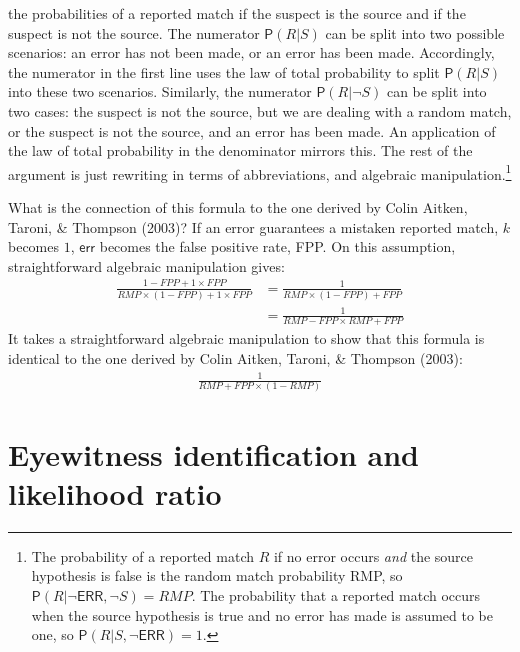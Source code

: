 \documentclass[
  10pt,
  dvipsnames,enabledeprecatedfontcommands]{scrartcl}
\newcommand{\n}{\neg}
\newcommand{\pr}[1]{\mathsf{P}(#1)}
\begin{document}
the probabilities of a reported match if the suspect is the source and
if the suspect is not the source. The numerator \(\pr{R\vert S}\) can be
split into two possible scenarios: an error has not been made, or an
error has been made. Accordingly, the numerator in the first line uses
the law of total probability to split \(\pr{R\vert S}\) into these two
scenarios. Similarly, the numerator \(\pr{R\vert \n S}\) can be split
into two cases: the suspect is not the source, but we are dealing with a
random match, or the suspect is not the source, and an error has been
made. An application of the law of total probability in the denominator
mirrors this. The rest of the argument is just rewriting in terms of
abbreviations, and algebraic manipulation.\footnote{The probability of a
  reported match \(R\) if no error occurs \textit{and} the source
  hypothesis is false is the random match probability RMP, so
  \(\pr{R \vert \n \mathsf{ERR}, \n S}=RMP\). The probability that a
  reported match occurs when the source hypothesis is true and no error
  has made is assumed to be one, so
  \(\pr{R \vert S, \n \mathsf{ERR}} =1\).}

What is the connection of this formula to the one derived by Colin
Aitken, Taroni, \& Thompson (2003)? If an error guarantees a mistaken
reported match, \(k\) becomes \(1\), \(\mathsf{err}\) becomes the false
positive rate, FPP. On this assumption, straightforward algebraic
manipulation gives: \begin{align*}
 \frac{1-FPP+ 1\times FPP}{RMP\times (1-FPP)+1\times FPP} & = \frac{1}{RMP \times (1-FPP)+FPP}\\
 & = \frac{1}{RMP - FPP\times RMP + FPP} 
\end{align*} \noindent   It takes a straightforward algebraic
manipulation to show that this formula is identical to the one derived
by Colin Aitken, Taroni, \& Thompson (2003): \begin{align*}
\frac{1}{RMP + FPP \times (1-RMP)} 
\end{align*}

\hypertarget{eyewitness-identification-and-likelihood-ratio}{%
\section{\texorpdfstring{Eyewitness identification and likelihood ratio
\label{sec:eyewitness}}{Eyewitness identification and likelihood ratio }}\label{eyewitness-identification-and-likelihood-ratio}}
\end{document}
